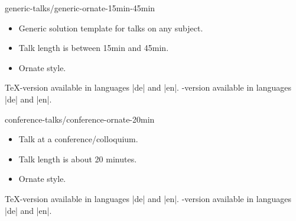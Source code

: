 \begin{solution}{generic-talks/generic-ornate-15min-45min}
  \begin{itemize}
  \item
    Generic solution template for talks on any subject.
  \item
    Talk length is between 15min and 45min.
  \item
    Ornate style.
  \end{itemize}
  \beamernote \TeX-version available in languages |de| and |en|.
  \lyxnote    \LyX-version available in languages |de| and |en|.
\end{solution}

\begin{solution}{conference-talks/conference-ornate-20min}
  \begin{itemize}
  \item
    Talk at a conference/colloquium.
  \item
    Talk length is about 20 minutes.
  \item
    Ornate style.
  \end{itemize}
  \beamernote \TeX-version available in languages |de| and |en|.
  \lyxnote    \LyX-version available in languages |de| and |en|.
\end{solution}


